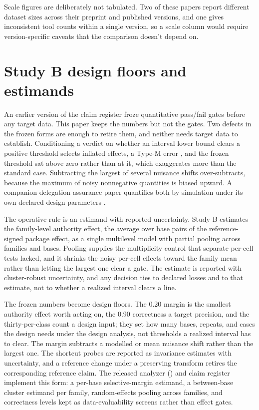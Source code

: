 \documentclass[12pt]{article}
\begin{document}
Scale figures are deliberately not tabulated. Two of these papers report
different dataset sizes across their preprint and published versions, and one
gives inconsistent tool counts within a single version, so a scale column would
require version-specific caveats that the comparison doesn't depend on.

\section{Study B design floors and estimands}

An earlier version of the claim register froze quantitative pass/fail gates
before any target data. This paper keeps the numbers but not the gates. Two
defects in the frozen forms are enough to retire them, and neither needs target
data to establish. Conditioning a verdict on whether an interval lower bound
clears a positive threshold selects inflated effects, a Type-M error
\citep{gelman2014types}, and the frozen threshold sat above zero rather than at
it, which exaggerates more than the standard case. Subtracting the largest of
several nuisance shifts over-subtracts, because the maximum of noisy
nonnegative quantities is biased upward. A companion delegation-assurance paper
quantifies both by simulation under its own declared design parameters
\citep{reynolds2026delegationAssurance}.

The operative rule is an estimand with reported uncertainty. Study B estimates
the family-level authority effect, the average over base pairs of the
reference-signed package effect, as a single multilevel model with partial
pooling across families and bases. Pooling supplies the multiplicity control
that separate per-cell tests lacked, and it shrinks the noisy per-cell effects
toward the family mean rather than letting the largest one clear a gate. The
estimate is reported with cluster-robust uncertainty, and any decision ties to
declared losses and to that estimate, not to whether a realized interval clears
a line.

The frozen numbers become design floors. The 0.20 margin is the smallest
authority effect worth acting on, the 0.90 correctness a target precision, and
the thirty-per-class count a design input; they set how many bases, repeats,
and cases the design needs under the design analysis, not thresholds a realized
interval has to clear. The margin subtracts a modelled or mean nuisance shift
rather than the largest one. The shortcut probes are reported as invariance
estimates with uncertainty, and a reference change under a preserving transform
retires the corresponding reference claim. The released analyzer
() and claim register implement this form: a
per-base selective-margin estimand, a between-base cluster estimand per family,
random-effects pooling across families, and correctness levels kept as
data-evaluability screens rather than effect gates.
\end{document}
